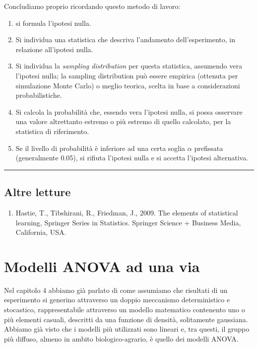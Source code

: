 \documentclass[a4paper,12pt,oneside]{book}
\providecommand{\tightlist}{%
  \setlength{\itemsep}{0pt}\setlength{\parskip}{0pt}}
\begin{document}
Concludiamo proprio ricordando questo metodo di lavoro:

\begin{enumerate}
\def\labelenumi{\arabic{enumi}.}
\tightlist
\item
  si formula l'ipotesi nulla.
\item
  Si individua una statistica che descriva l'andamento dell'esperimento, in relazione all'ipotesi nulla.
\item
  Si individua la \emph{sampling distribution} per questa statistica, assumendo vera l'ipotesi nulla; la sampling distribution può essere empirica (ottenuta per simulazione Monte Carlo) o meglio teorica, scelta in base a considerazioni probabilistiche.
\item
  Si calcola la probabilità che, essendo vera l'ipotesi nulla, si possa osservare una valore altrettanto estremo o più estremo di quello calcolato, per la statistica di riferimento.
\item
  Se il livello di probabilità è inferiore ad una certa soglia \(\alpha\) prefissata (generalmente 0.05), si rifiuta l'ipotesi nulla e si accetta l'ipotesi alternativa.
\end{enumerate}

\begin{center}\rule{0.5\linewidth}{0.5pt}\end{center}

\hypertarget{altre-letture-5}{%
\section{Altre letture}\label{altre-letture-5}}

\begin{enumerate}
\def\labelenumi{\arabic{enumi}.}
\tightlist
\item
  Hastie, T., Tibshirani, R., Friedman, J., 2009. The elements of statistical learning, Springer Series in Statistics. Springer Science + Business Media, California, USA.
\end{enumerate}

\hypertarget{modelli-anova-ad-una-via}{%
\chapter{Modelli ANOVA ad una via}\label{modelli-anova-ad-una-via}}

Nel capitolo 4 abbiamo già parlato di come assumiamo che risultati di un esperimento si generino attraverso un doppio meccanismo deterministico e stocastico, rappresentabile attraverso un modello matematico contenento uno o più elementi casuali, descritti da una funzione di densità, solitamente gaussiana. Abbiamo già visto che i modelli più utilizzati sono lineari e, tra questi, il gruppo più diffuso, almeno in ambito biologico-agrario, è quello dei modelli ANOVA.
\end{document}
